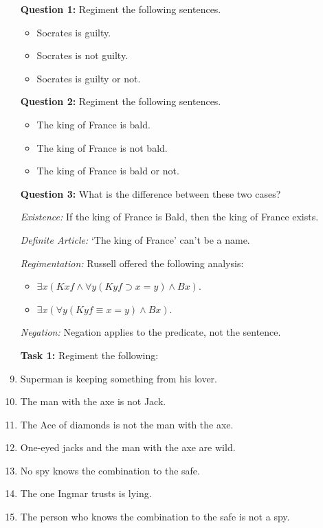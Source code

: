 \documentclass[a4paper, 11pt]{article} %
\begin{document}
\begin{enumerate}
  \item[\bf Question 1:] Regiment the following sentences.
    \begin{itemize}
      \item Socrates is guilty.
      \item Socrates is not guilty.
      \item Socrates is guilty or not.
    \end{itemize}
  \item[\bf Question 2:] Regiment the following sentences.
    \begin{itemize}
      \item The king of France is bald.
      \item The king of France is not bald.
      \item The king of France is bald or not.
    \end{itemize}
  \item[\bf Question 3:] What is the difference between these two cases?
  \item[\it Existence:] If the king of France is Bald, then the king of France exists.
  \item[\it Definite Article:] `The king of France' can't be a name.
  \item[\it Regimentation:] Russell offered the following analysis:
    \begin{itemize}
      \item $\exists x(Kxf \wedge \forall y(Kyf \supset x=y) \wedge Bx)$.
      \item $\exists x(\forall y(Kyf \equiv x=y) \wedge Bx)$.
    \end{itemize}
  \item[\it Negation:] Negation applies to the predicate, not the sentence.
  \item[\bf Task 1:] Regiment the following:
  \item Superman is keeping something from his lover.
  \item The man with the axe is not Jack.
  \item The Ace of diamonds is not the man with the axe.
  \item One-eyed jacks and the man with the axe are wild.
  \item No spy knows the combination to the safe.
  \item The one Ingmar trusts is lying.
  \item The person who knows the combination to the safe is not a spy.
\end{enumerate}
\end{document}
